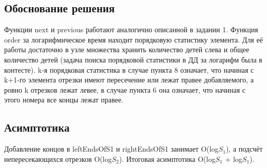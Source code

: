 \subsection{Обоснование решения}
Функции next и previous работают аналогично описанной в задании 1. Функция order за логарифмическое время находит порядковую статистику элемента. Для её работы достаточно в узле множества хранить количество детей слева и общее количество детей (задача поиска порядковой статистики в ДД за логарифм была в контесте). k-я порядковая статистика в случае пункта 8 означает, что начиная с k+1-го элемента отрезки имеют пересечение или лежат правее добавляемого, а ровно k отрезков лежат левее, в случае пункта 6 она означает, что начиная с этого номера все концы лежат правее.

\subsection{Асимптотика}
Добавление концов в leftEndsOfS1 и rightEndsOfS1 занимает O(log$S_1$), а подсчёт непересекающихся отрезков O(log$S_2$). Итоговая асимптотика O(log$S_1$ + log$S_1$).

